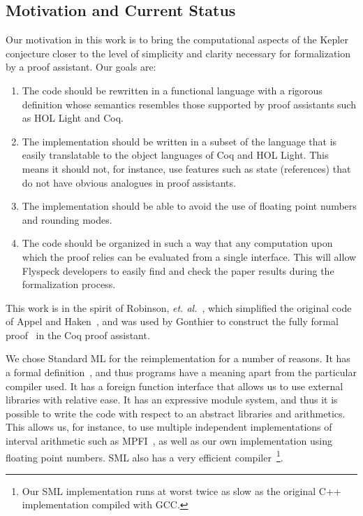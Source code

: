 \documentclass[11pt]{amsart}
\begin{document}



\subsection*{Motivation and Current Status}
\label{sec:sean}

Our motivation in this work is to bring the computational aspects of
the Kepler conjecture closer to the level of simplicity and clarity
necessary for formalization by a proof assistant. Our goals are:

\begin{enumerate}
\item The code should be rewritten in a functional language with a
  rigorous definition whose semantics resembles those supported by
  proof assistants such as HOL Light and Coq.
\item The implementation should be written in a subset of the language
  that is easily translatable to the object languages of Coq and HOL
  Light. This means it should not, for instance, use features such as state
  (references) that do not have obvious analogues in proof assistants.
\item The implementation should be able to avoid the use of floating
  point numbers and rounding modes.
\item The code should be organized in such a way that any
  computation upon which the proof relies can be evaluated from a single
  interface.  This will allow Flyspeck developers to easily find and
  check the paper results during the formalization process.
\end{enumerate} 

\noindent This
work is in the spirit of Robinson, \textit{et.
al.}~\cite{Robertson:1997:JCTB}, which simplified the original code of
Appel and Haken~\cite{Appel:1986:FourColor}, and was used by Gonthier to
construct the fully formal proof~\cite{Gonthier:2005:FourColor} in the
Coq proof assistant. 

We chose Standard ML for the reimplementation for a number of reasons.
It has a formal definition~\cite{Milner:1990:SML}, and thus programs
have a meaning apart from the particular compiler used. It has a
foreign function interface that allows us to use external libraries
with relative ease. It has an expressive module system, and thus it is
possible to write the code with respect to an abstract libraries and
arithmetics. This allows us, for instance, to use multiple independent
implementations of interval arithmetic such as
MPFI~\cite{Revol:2005:MPFI}, as well as our own implementation using
floating point numbers. SML also has a very efficient
compiler~\cite{website:MLton}\footnote{Our SML implementation runs at
worst twice as slow as the original C++ implementation compiled with GCC.}.
\end{document}

